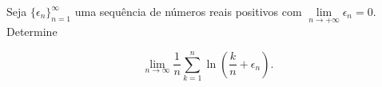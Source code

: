 Seja \(\{\epsilon_n\}^\infty_{n=1}\) uma sequência de números reais positivos com \(\lim\limits_{n\rightarrow+\infty}\epsilon_n = 0\). Determine 

\[
\lim\limits_{n\rightarrow\infty}\dfrac{1}{n}\sum\limits^{n}_{k=1}\ln\left(\dfrac{k}{n}+\epsilon_n\right).
\]
